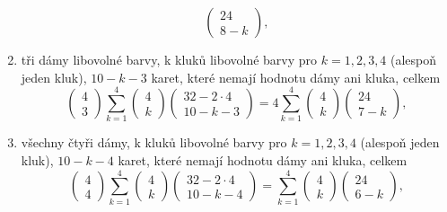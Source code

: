 \begin{example}
\begin{enumerate}
\begin{equation*}
                            \begin{pmatrix} 24 \\ 8 - k \end{pmatrix},
            \end{equation*}
      \item tři dámy libovolné barvy, k kluků libovolné barvy pro \(k = 1, 2, 3, 4\) (alespoň jeden 
            kluk), \(10 - k - 3\) karet, které nemají hodnotu dámy ani kluka, celkem
            \begin{equation*}
              \begin{pmatrix} 4  \\ 3 \end{pmatrix}
              \sum^{4}_{k=1}\begin{pmatrix} 4  \\ k \end{pmatrix}
                            \begin{pmatrix} 32 - 2\cdot4 \\ 10 - k - 3 \end{pmatrix} =
              4\sum^{4}_{k=1}\begin{pmatrix} 4  \\ k \end{pmatrix}
                            \begin{pmatrix} 24 \\ 7 - k \end{pmatrix},
            \end{equation*}
      \item všechny čtyři dámy, k kluků libovolné barvy pro \(k = 1, 2, 3, 4\) (alespoň jeden 
            kluk), \(10 - k - 4\) karet, které nemají hodnotu dámy ani kluka, celkem
            \begin{equation*}
              \begin{pmatrix} 4  \\ 4 \end{pmatrix}
              \sum^{4}_{k=1}\begin{pmatrix} 4  \\ k \end{pmatrix}
                            \begin{pmatrix} 32 - 2\cdot4 \\ 10 - k - 4 \end{pmatrix} =
              \sum^{4}_{k=1}\begin{pmatrix} 4  \\ k \end{pmatrix}
                            \begin{pmatrix} 24 \\ 6 - k \end{pmatrix},
            \end{equation*}
    \end{enumerate}
    

\end{example}
